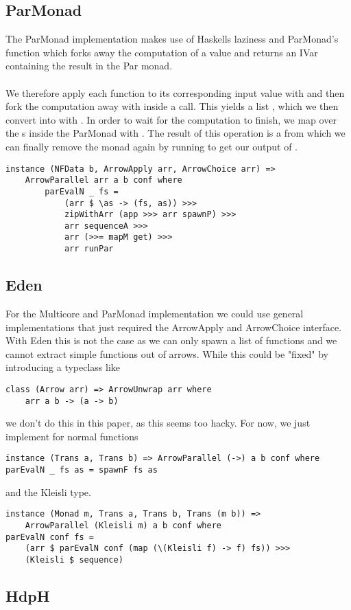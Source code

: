 \subsection{ParMonad}
The ParMonad implementation makes use of Haskells laziness and ParMonad's  function which forks away the computation of a value and returns an IVar containing the result in the Par monad.
\\\\
We therefore apply each function to its corresponding input value with  and then fork the computation away with  inside a  call. This yields a list , which we then convert into  with . In order to wait for the computation to finish, we map over the s inside the ParMonad with . The result of this operation is a  from which we can finally remove the monad again by running  to get our output of \code{[b]}.
\begin{lstlisting}[frame=htrbl]
instance (NFData b, ArrowApply arr, ArrowChoice arr) =>
	ArrowParallel arr a b conf where
		parEvalN _ fs = 
			(arr $ \as -> (fs, as)) >>>
			zipWithArr (app >>> arr spawnP) >>>
			arr sequenceA >>>
			arr (>>= mapM get) >>>
			arr runPar
\end{lstlisting}

\subsection{Eden}
For the Multicore and ParMonad implementation we could use general implementations that just required the ArrowApply and ArrowChoice interface. With Eden this is not the case as we can only spawn a list of functions and we cannot extract simple functions out of arrows. While this could be "fixed" by introducing a typeclass like
\begin{lstlisting}[frame=htrbl]
class (Arrow arr) => ArrowUnwrap arr where
	arr a b -> (a -> b)
\end{lstlisting}
we don't do this in this paper, as this seems too hacky. For now, we just implement  for normal functions
\begin{lstlisting}[frame=htrbl]
instance (Trans a, Trans b) => ArrowParallel (->) a b conf where
parEvalN _ fs as = spawnF fs as
\end{lstlisting}
and the Kleisli type.
\begin{lstlisting}[frame=htrbl]
instance (Monad m, Trans a, Trans b, Trans (m b)) =>
	ArrowParallel (Kleisli m) a b conf where
parEvalN conf fs =
	(arr $ parEvalN conf (map (\(Kleisli f) -> f) fs)) >>>
	(Kleisli $ sequence)
\end{lstlisting}

\subsection{HdpH}
